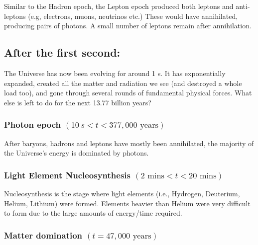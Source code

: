 \documentclass[]{book}
\begin{document}
Similar to the Hadron epoch, the Lepton epoch produced both leptons and
anti-leptons (e.g, electrons, muons, neutrinos etc.) These would have
annihilated, producing pairs of photons. A small number of leptons
remain after annihilation.

\hypertarget{sec:after_1s}{%
\subsection{After the first second:}\label{sec:after_1s}}

The Universe has now been evolving for around 1 s. It has exponentially
expanded, created all the matter and radiation we see (and destroyed a
whole load too), and gone through several rounds of fundamental physical
forces. What else is left to do for the next 13.77 billion years?

\hypertarget{photon-epoch-10s-t-377000text-years}{%
\subsubsection*{\texorpdfstring{Photon epoch \((10~s < t < 377,000\text{ years})\)}{Photon epoch (10\textasciitilde{}s \textless{} t \textless{} 377,000\textbackslash{}text\{ years\})}}\label{photon-epoch-10s-t-377000text-years}}

After baryons, hadrons and leptons have mostly been annihilated, the
majority of the Universe's energy is dominated by photons.

\hypertarget{light-element-nucleosynthesis-2-text-mins-t-20text-mins}{%
\subsubsection*{\texorpdfstring{Light Element Nucleosynthesis \((2 \text{ mins} < t < 20\text{ mins})\)}{Light Element Nucleosynthesis (2 \textbackslash{}text\{ mins\} \textless{} t \textless{} 20\textbackslash{}text\{ mins\})}}\label{light-element-nucleosynthesis-2-text-mins-t-20text-mins}}

Nucleosynthesis is the stage where light elements (i.e., Hydrogen,
Deuterium, Helium, Lithium) were formed. Elements heavier than Helium
were very difficult to form due to the large amounts of energy/time
required.

\hypertarget{matter-domination-t-47000text-years}{%
\subsubsection*{\texorpdfstring{Matter domination \((t = 47,000\text{ years})\)}{Matter domination (t = 47,000\textbackslash{}text\{ years\})}}\label{matter-domination-t-47000text-years}}
\end{document}
